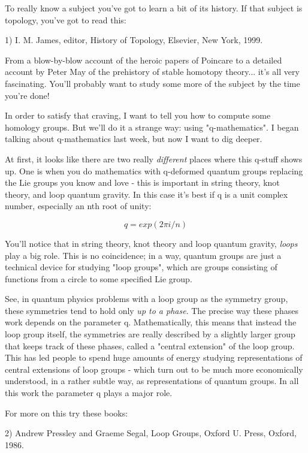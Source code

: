 



To really know a subject you've got to learn a bit of its
history.  If that subject is topology, you've got to read this:

1) I. M. James, editor, History of Topology, Elsevier, New York, 1999.  

From a blow-by-blow account of the heroic papers of Poincare to a 
detailed account by Peter May of the prehistory of stable homotopy 
theory... it's all very fascinating.  You'll probably want to study
some more of the subject by the time you're done!  

In order to satisfy that craving, I want to tell you how to compute some 
homology groups.  But we'll do it a strange way: using "q-mathematics".
I began talking about q-mathematics last week, but now I want to dig 
deeper. 

At first, it looks like there are two really \emph{different} places where
this q-stuff shows up.   One is when you do mathematics with q-deformed
quantum groups replacing the Lie groups you know and love - this is
important in string theory, knot theory, and loop quantum gravity.  
In this case it's best if q is a unit complex number, especially an
nth root of unity:

$$
q = exp(2\pi i/n)
$$
    
You'll notice that in string theory, knot theory and loop quantum
gravity, \emph{loops} play a big role.  This is no coincidence; in a way,
quantum groups are just a technical device for studying "loop groups",
which are groups consisting of functions from a circle to some
specified Lie group.  

See, in quantum physics problems with a loop group as the symmetry
group, these symmetries tend to hold only \emph{up to a phase}.  The precise
way these phases work depends on the parameter q.  Mathematically, this
means that instead the loop group itself, the symmetries are really
described by a slightly larger group that keeps track of these phases,
called a "central extension" of the loop group.  This has led people 
to spend huge amounts of energy studying representations of central
extensions of loop groups - which turn out to be much more economically
understood, in a rather subtle way, as representations of quantum groups.  
In all this work the parameter q plays a major role.  

For more on this try these books:

2) Andrew Pressley and Graeme Segal, Loop Groups, Oxford U. Press,
Oxford, 1986.

